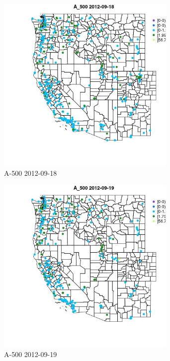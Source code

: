 \begin{figure} 
\centering  
\includegraphics[width=0.77\textwidth]{Code_Outputs/ML_input_report_ML_input_PM25_Step5_part_d_de_duplicated_aves_ML_input_MapObsA_5002012-09-18.jpg} 
\caption{\label{fig:ML_input_report_ML_input_PM25_Step5_part_d_de_duplicated_aves_ML_inputMapObsA_5002012-09-18}A-500 2012-09-18} 
\end{figure} 
 

\begin{figure} 
\centering  
\includegraphics[width=0.77\textwidth]{Code_Outputs/ML_input_report_ML_input_PM25_Step5_part_d_de_duplicated_aves_ML_input_MapObsA_5002012-09-19.jpg} 
\caption{\label{fig:ML_input_report_ML_input_PM25_Step5_part_d_de_duplicated_aves_ML_inputMapObsA_5002012-09-19}A-500 2012-09-19} 
\end{figure} 
 


